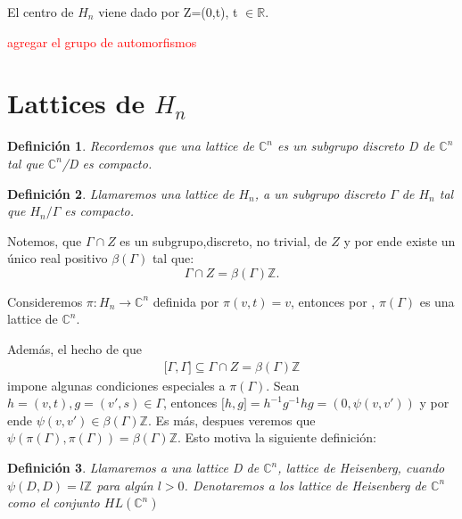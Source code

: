 \documentclass[12pt]{article}
\newtheorem{definition}{Definición}
\begin{document}
El centro de $H_{n}$ viene dado por Z=(0,t), t $\in \mathbb{R}.$

\textcolor{red}{agregar el grupo de automorfismos }

\section{Lattices de $H_n$}

\begin{definition}
 Recordemos que una lattice de $\mathbb{C}^n$ es un subgrupo discreto D de $\mathbb{C}^n$ tal que $\mathbb{C}^n$/D es compacto.
\end{definition}

\begin{definition}
 Llamaremos una lattice de $H_n$, a un subgrupo discreto $\Gamma$ de $H_n$ tal que $H_n/\Gamma$ es compacto.
\end{definition}

Notemos, que  $\Gamma \cap Z$ es un subgrupo,discreto, no trivial, de $Z$ y 
por ende existe un único real positivo $\beta(\Gamma)$ tal que:
$$
\Gamma \cap Z=\beta(\Gamma) \mathbb{Z}.
$$

Consideremos $\pi :H_{n}\rightarrow \mathbb{C}^{n}$  definida por $\pi (v,t)=v$,
entonces por \cite{Ma}, $\pi(\Gamma)$ es una lattice de $\mathbb{C}^n$.

Además, el hecho de que
$$\begin{aligned}
{[} \Gamma,\Gamma {]} \subseteq \Gamma \cap Z = \beta(\Gamma) \mathbb{Z}
\end{aligned}$$
impone algunas condiciones especiales a $\pi(\Gamma)$.
Sean $h=(v,t),g=(v',s) \in \Gamma$, entonces ${[}h,g{]}=h^{-1}g^{-1}hg=(0,\psi(v,v'))$ 
y por ende $\psi(v,v') \in  \beta(\Gamma) \mathbb{Z}$.
Es más, despues veremos que $\psi(\pi(\Gamma),\pi(\Gamma))=\beta(\Gamma) \mathbb{Z}$.
Esto motiva la siguiente definición:

\begin{definition}
 Llamaremos a una lattice D de $\mathbb{C}^n$, lattice de Heisenberg, cuando $\psi(D,D)=l \mathbb{Z} $ para algún $l > 0$.
 Denotaremos a los lattice de Heisenberg de $\mathbb{C}^n$ como el conjunto $HL(\mathbb{C}^n)$
\end{definition}
\end{document}
